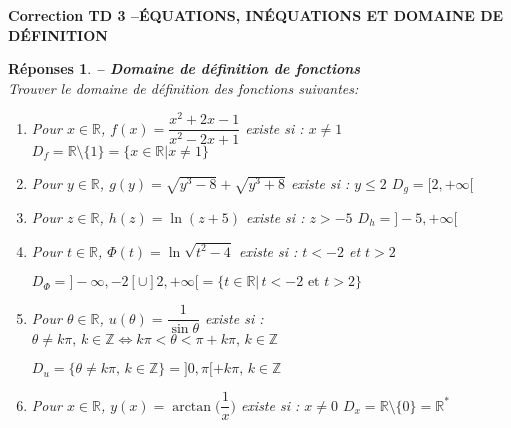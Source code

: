 \documentclass[a4paper,11pt]{article}
\newenvironment{alphate}{\begin{enumerate}[label=\alph*)]}{\end{enumerate}}
\newtheorem{rep}{R\'eponses}
\newenvironment{reponse}{\begin{rep} \em}{\end{rep}}
\begin{document}



\begin{center}
{\bf Correction TD 3 \quad--\quad \'EQUATIONS, IN\'EQUATIONS ET DOMAINE DE 
D\'EFINITION}
\end{center}
\bigskip 

\addtocounter{rep}{14}


\begin{reponse} {\bf -- Domaine de d\'efinition de fonctions}
\label{TD6-domaine}\\ 
Trouver le domaine de d\'efinition des fonctions suivantes:
\begin{alphate}
\item Pour $ x \in \mathbb{R}$, $f(x)=\dfrac{x^2+2x-1}{x^2-2x+1}$ existe si :
    $x \neq 1 $  \hspace{1cm}
    $\boxed{D_f = \mathbb{R}\setminus\{1\} = \{x \in \mathbb{R} | x \neq 1\}}$
\item  Pour $ y \in \mathbb{R}$, $g(y)=\sqrt{y^3-8}+\sqrt{y^3+8}$ existe si :
    $y \leq 2 $  \hspace{1cm}
    $\boxed{D_g = [2, +\infty[}$  
\item Pour $ z \in \mathbb{R}$, $h(z)=\ln(z+5)$ existe si :
    $z > -5 $  \hspace{1cm}
    $\boxed{D_h = ]-5, +\infty[}$
\item Pour $ t \in \mathbb{R}$, $\Phi(t)=\ln\sqrt{t^2-4}$ existe si :
    $t < -2$ et $t >2$ 
    \begin{center}
        $\boxed{D_{\Phi} =]-\infty,-2[\cup]2,+\infty[= \{t \in \mathbb{R} | \, t < -2 \text{ et } t >2 \}}$
    \end{center}
\item Pour $ \theta \in \mathbb{R}$, $u(\theta)=\dfrac{1}{\sin\theta}$ existe si :
    $ \theta \neq k\pi, \, k\in \mathbb{Z} \Leftrightarrow k\pi < \theta < \pi + k\pi, \, k\in \mathbb{Z} $      
    \begin{center}
        $\boxed{D_{u} = \{\theta \neq k\pi, \, k\in \mathbb{Z} \}
        =]0,\pi[ + k \pi, \, k\in \mathbb{Z} }$
    \end{center}
\item Pour $ x \in \mathbb{R}$, $y(x)=\arctan \big(\dfrac{1}{x}\big)$ existe si :
    $x \neq 0 $  \hspace{1cm}
    $\boxed{D_x = \mathbb{R}\setminus\{0\} =  \mathbb{R}^* }$

\end{alphate}
\end{reponse}
\end{document}
